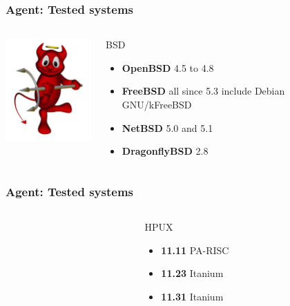 \documentclass{beamer}
\begin{document}
\begin{frame}
    \frametitle{Agent: Tested systems}

\begin{columns}
 \begin{column}[T]{4cm}
    \includegraphics[height=4.0cm]{pics/os/bsd.jpg}
 \end{column}
 \begin{column}[t]{5cm}
    \begin{block}{BSD}
        \begin{itemize}
            \item \textbf{OpenBSD} 4.5 to 4.8
            \item \textbf{FreeBSD} all since 5.3 include Debian GNU/kFreeBSD
            \item \textbf{NetBSD} 5.0 and 5.1
            \item \textbf{DragonflyBSD} 2.8
        \end{itemize}
    \end{block}
 \end{column}
\end{columns}

\end{frame}


\begin{frame}
    \frametitle{Agent: Tested systems}
\begin{columns}
 \begin{column}[T]{4cm}
 \end{column}
 \begin{column}[t]{5cm}

    \begin{block}{HPUX}
        \begin{itemize}
            \item \textbf{11.11} PA-RISC
            \item \textbf{11.23} Itanium
            \item \textbf{11.31} Itanium
        \end{itemize}
    \end{block}
 \end{column}
\end{columns}

\end{frame}
\end{document}
